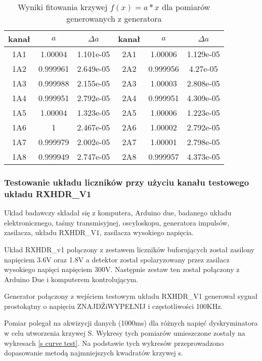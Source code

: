 \begin{table}
        \centering
        \caption{Wyniki fitowania krzywej $f(x) = a*x$ dla pomiarów generowanych z generatora}
        \label{multi fit}
        \begin{tabular}{|c|c|c||c|c|c|}
                \hline
                kanał & $a$ & $\Delta a$  &kanał & $a$ & $\Delta a$ \\ \hline
                1A1 & 1.00004 & 1.101e-05 & 2A1 &1.00006&1.129e-05 \\ \hline
                1A2 & 0.999961 &2.649e-05& 2A2 &0.999956&4.27e-05 \\ \hline
                1A3 & 0.999988&2.155e-05&2A3 & 1.00003&2.808e-05\\ \hline
                1A4 & 0.999951&2.792e-05&2A4&0.999951&4.309e-05\\ \hline
                1A5&1.00004&1.323e-05&2A5&1.00006&1.223e-05\\ \hline
                1A6&1&2.467e-05&2A6&1.00002&2.792e-05 \\ \hline
                1A7&0.999979&2.002e-05&2A7&1.00001&2.798e-05 \\ \hline
                1A8 &0.999949&2.747e-05&2A8&0.999957&4.373e-05 \\ \hline
        \end{tabular}
\end{table}



\subsubsection{Testowanie układu liczników przy użyciu kanału testowego układu RXHDR\_V1}
\label{section RXHDR test}

Układ badawczy składał się z komputera, Arduino due, badanego układu elektronicznego, taśmy transmisyjnej, oscyloskopu, generatora impulsów, zasilacza, układu RXHDR\_V1, zasilacza wysokiego napięcia. 

Układ RXHDR\_v1 połączony z zestawem liczników buforujących został zasilony napięciem 3.6V oraz 1.8V a detektor został spolaryzowany przez zasilacz wysokiego napięci napięciem 300V. Następnie zestaw ten został połączony z Arduino Due i komputerem kontrolującym. 

Generator połączony z wejściem testowym układu RXHDR\_V1 generował sygnał prostokątny o napięciu ZNAJDŹiWYPEŁNIJ i częstotliwości 100KHz. 

Pomiar polegał na akwizycji danych (1000ms) dla różnych napięć dyskryminatora w celu utworzenia krzywej S. Wykresy tych pomiarów umieszczone zostały na wykresach \ref{s curve test}. Na podstawie tych wykresów przeprowadzono dopasowanie metodą najmniejszych kwadratów krzywej s.

